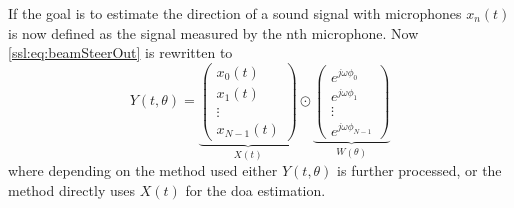 If the goal is to estimate the direction of a sound signal with microphones 
$x_n(t)$ is now defined as the signal measured by the nth microphone.
Now \eqref{ssl:eq:beamSteerOut} is rewritten to 
\begin{equation}
  \label{ssl:eq:beamSteerIn}
  Y(t, \theta) = 
    \underbrace{\begin{pmatrix} x_0(t) \\ 
      x_1(t) \\
      \vdots \\ 
      x_{N-1}(t)
    \end{pmatrix}}_{X(t)}
    \odot
    \underbrace{\begin{pmatrix} e^{j\omega \phi_0} \\ 
                    e^{j\omega \phi_1} \\
                    \vdots \\ 
                    e^{j\omega \phi_{N-1}} 
      \end{pmatrix}}_{W(\theta)}
\end{equation}
where depending on the method used either $Y(t, \theta)$ is further processed, or the 
method directly uses $X(t)$ for the \acrshort*{doa} estimation.

